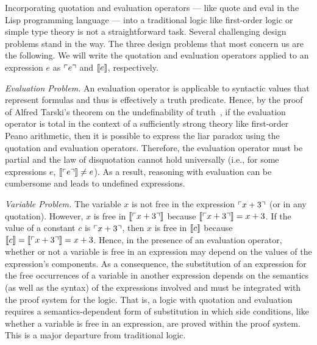 \documentclass[fleqn]{llncs}
\begin{document}
Incorporating quotation and evaluation operators --- like quote and
eval in the Lisp programming language --- into a traditional logic
like first-order logic or simple type theory is not a straightforward
task.  Several challenging design problems stand in the way.  The
three design problems that most concern us are the following.  We will
write the quotation and evaluation operators applied to an expression
$e$ as $\ulcorner e\urcorner$ and $\llbracket e\rrbracket$, respectively.

\be

  \item \emph{Evaluation Problem.}  An evaluation operator is
    applicable to syntactic values that represent formulas and thus is
    effectively a truth predicate.  Hence, by the proof of Alfred
    Tarski's theorem on the undefinability of truth~\cite{Tarski35a},
    if the evaluation operator is total in the context of a
    sufficiently strong theory like first-order Peano arithmetic, then
    it is possible to express the liar paradox using the quotation and
    evaluation operators.  Therefore, the evaluation operator must be
    partial and the law of disquotation cannot hold universally (i.e.,
    for some expressions $e$, $\llbracket\ulcorner e\urcorner\rrbracket \not= e$).  As
    a result, reasoning with evaluation can be cumbersome and leads to
    undefined expressions.

  \item \emph{Variable Problem.}  The variable $x$ is not free in the
    expression $\ulcorner x + 3\urcorner$ (or in any quotation).  However, $x$
    is free in $\llbracket\ulcorner x + 3\urcorner\rrbracket$ because
    $\llbracket\ulcorner x + 3\urcorner\rrbracket = x + 3$.  If the value of a constant
    $c$ is $\ulcorner x + 3\urcorner$, then $x$ is free in $\llbracket c\rrbracket$
    because $\llbracket c\rrbracket = \llbracket\ulcorner x + 3\urcorner\rrbracket = x + 3$.
    Hence, in the presence of an evaluation operator, whether or not a
    variable is free in an expression may depend on the values of the
    expression's components.  As a consequence, the substitution of an
    expression for the free occurrences of a variable in another
    expression depends on the semantics (as well as the syntax) of the
    expressions involved and must be integrated with the proof system
    for the logic.  That is, a logic with quotation and evaluation
    requires a semantics-dependent form of substitution in which side
    conditions, like whether a variable is free in an expression, are
    proved within the proof system.  This is a major departure from
    traditional logic.
\end{document}

